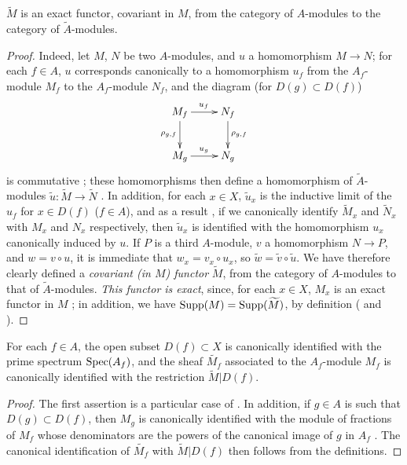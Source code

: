 \begin{proposition}[1.3.5]
\label{I.1.3.5}
$\widetilde{M}$ is an exact functor, covariant in $M$, from the category of $A$-modules to the category of $\widetilde{A}$-modules.
\end{proposition}

\begin{proof}
\label{proof-I.1.3.5}
Indeed, let $M$, $N$ be two $A$-modules, and $u$ a homomorphism $M\to N$;
for each $f\in A$, $u$ corresponds canonically to a homomorphism $u_f$ from the $A_f$-module $M_f$ to the $A_f$-module $N_f$, and the diagram (for $D(g)\subset D(f)$)
\[
  \xymatrix{
    M_f\ar[r]^{u_f}\ar[d]_{\rho_{g,f}} & N_f\ar[d]^{\rho_{g,f}}\\
    M_g\ar[r]^{u_g} & N_g
  }
\]
is commutative ;
these homomorphisms then define a homomorphism of $\widetilde{A}$-modules $\widetilde{u}:\widetilde{M}\to\widetilde{N}$ .
In addition, for each $x\in X$, $\widetilde{u}_x$ is the inductive limit of the $u_f$ for $x\in D(f)$ ($f\in A$), and as a result , if we canonically identify $\widetilde{M}_x$ and $\widetilde{N}_x$ with $M_x$ and $N_x$ respectively, then $\widetilde{u}_x$ is identified with the homomorphism $u_x$ canonically induced by $u$.
If $P$ is a third $A$-module, $v$ a homomorphism $N\to P$, and $w=v\circ u$, it is immediate that $w_x=v_x\circ u_x$, so $\widetilde{w}=\widetilde{v}\circ\widetilde{u}$.
We have therefore clearly defined a \emph{covariant (in $M$) functor} $\widetilde{M}$, from the category of $A$-modules to that of $\widetilde{A}$-modules.
\emph{This functor is exact}, since, for each $x\in X$, $M_x$ is an exact functor in $M$ ;
in addition, we have $\operatorname{Supp}(M)=\operatorname{Supp}(\widetilde{M})$, by definition ( and ).
\end{proof}

\begin{proposition}[1.3.6]
\label{I.1.3.6}
For each $f\in A$, the open subset $D(f)\subset X$ is canonically identified with the prime spectrum $\operatorname{Spec}(A_f)$, and the sheaf $\widetilde{M_f}$ associated to the $A_f$-module $M_f$ is canonically identified with the restriction $\widetilde{M}|D(f)$.
\end{proposition}

\begin{proof}
\label{proof-I.1.3.6}
The first assertion is a particular case of .
In addition, if $g\in A$ is such that $D(g)\subset D(f)$, then $M_g$ is canonically identified with the module of fractions of $M_f$ whose denominators are the powers of the canonical image of $g$ in $A_f$ .
The canonical identification of $\widetilde{M_f}$ with $\widetilde{M}|D(f)$ then follows from the definitions.
\end{proof}


